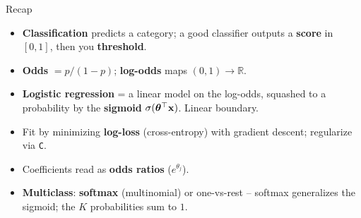 \documentclass[aspectratio=169]{beamer}
\begin{document}
\begin{frame}{Recap}
  \begin{itemize}\small
    \item \textbf{Classification} predicts a category; a good classifier outputs a
      \textbf{score} in $[0,1]$, then you \textbf{threshold}.
    \item \textbf{Odds} $=p/(1-p)$; \textbf{log-odds} maps $(0,1)\to\mathbb{R}$.
    \item \textbf{Logistic regression} = a linear model on the log-odds, squashed to a
      probability by the \textbf{sigmoid} $\sigma(\bm{\theta}^\top \mathbf{x})$. Linear boundary.
    \item Fit by minimizing \textbf{log-loss} (cross-entropy) with gradient descent;
      regularize via \texttt{C}.
    \item Coefficients read as \textbf{odds ratios} ($e^{\theta_j}$).
    \item \textbf{Multiclass}: \textbf{softmax} (multinomial) or one-vs-rest -- softmax
      generalizes the sigmoid; the $K$ probabilities sum to $1$.
  \end{itemize}
  \vfill
\end{frame}
\end{document}
